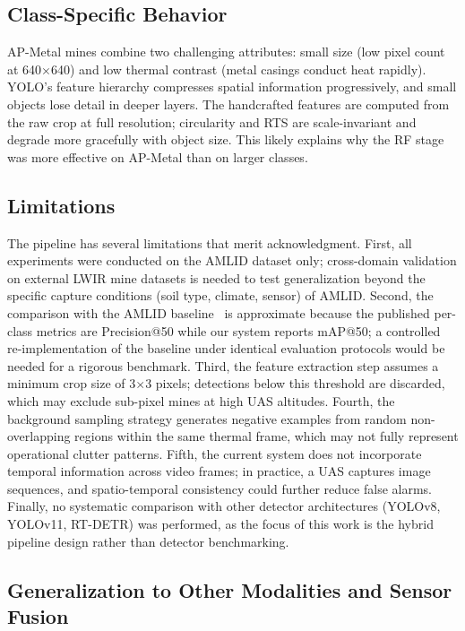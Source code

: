 \documentclass[conference]{IEEEtran}
\begin{document}
\subsection{Class-Specific Behavior}

AP-Metal mines combine two challenging attributes: small size (low pixel count at 640$\times$640) and low thermal contrast (metal casings conduct heat rapidly). YOLO's feature hierarchy compresses spatial information progressively, and small objects lose detail in deeper layers. The handcrafted features are computed from the raw crop at full resolution; circularity and RTS are scale-invariant and degrade more gracefully with object size. This likely explains why the RF stage was more effective on AP-Metal than on larger classes.

\subsection{Limitations}

The pipeline has several limitations that merit acknowledgment. First, all experiments were conducted on the AMLID dataset only; cross-domain validation on external LWIR mine datasets is needed to test generalization beyond the specific capture conditions (soil type, climate, sensor) of AMLID. Second, the comparison with the AMLID baseline~\cite{gallagher2025} is approximate because the published per-class metrics are Precision@50 while our system reports mAP@50; a controlled re-implementation of the baseline under identical evaluation protocols would be needed for a rigorous benchmark. Third, the feature extraction step assumes a minimum crop size of 3$\times$3 pixels; detections below this threshold are discarded, which may exclude sub-pixel mines at high UAS altitudes. Fourth, the background sampling strategy generates negative examples from random non-overlapping regions within the same thermal frame, which may not fully represent operational clutter patterns. Fifth, the current system does not incorporate temporal information across video frames; in practice, a UAS captures image sequences, and spatio-temporal consistency could further reduce false alarms. Finally, no systematic comparison with other detector architectures (YOLOv8, YOLOv11, RT-DETR) was performed, as the focus of this work is the hybrid pipeline design rather than detector benchmarking.

\subsection{Generalization to Other Modalities and Sensor Fusion}
\end{document}
